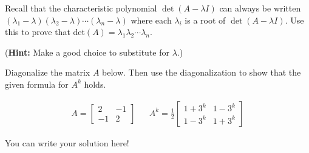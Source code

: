 \documentclass[]{exam}
\begin{document}
\begin{questions}

\question Recall that the characteristic polynomial $\det(A-\lambda I)$ can always be written $(\lambda_1 - \lambda)(\lambda_2 - \lambda) \cdots (\lambda_n - \lambda)$ where each $\lambda_i$ is a root of $\det(A-\lambda I)$. Use this to prove that det$(A) = \lambda_1\lambda_2\cdots\lambda_n$.

(\textbf{Hint:} Make a good choice to substitute for $\lambda$.)

\begin{solution}
	
\end{solution}

\question Diagonalize the matrix $A$ below. Then use the diagonalization to show that the given formula for $A^k$ holds.
	
\begin{align*}
	A = \begin{bmatrix}
	2 & -1 \\ -1 & 2
	\end{bmatrix} & &
	A^k = \frac{1}{2}\begin{bmatrix}
	1 + 3^k & 1 - 3^k \\ 1 - 3^k & 1 + 3^k
	\end{bmatrix}
\end{align*}

\begin{solution}
	You can write your solution here!
\end{solution}
	

\end{questions}
\end{document}
